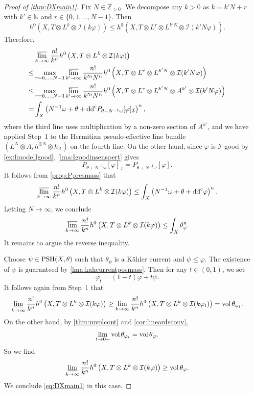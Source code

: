 \begin{proof}[Proof of \cref{thm:DXmain1}]
    Fix $N\in \mathbb{Z}_{>0}$. We decompose any $k>0$ as $k=k'N+r$ with $k'\in \mathbb{N}$ and $r\in \{0,1,\ldots,N-1\}$. Then
    \[
    h^0\left(X,T\otimes L^k\otimes  \mathcal{I}(k\varphi)\right)\leq h^0\left(X,T\otimes L^r \otimes L^{k'N}\otimes  \mathcal{I}(k'N\varphi)\right).
    \]
    Therefore,
    \[
    \begin{aligned}
     &\varlimsup_{k\to\infty}\frac{n!}{k^n}h^0\left(X,T\otimes L^k\otimes  \mathcal{I}(k\varphi)\right)\\
     \leq & \max_{r=0,\ldots,N-1}\varlimsup_{k'\to\infty}\frac{n!}{k'^nN^n} h^0\left(X,T\otimes L^r \otimes L^{k'N}\otimes  \mathcal{I}(k'N\varphi)\right)\\
     \leq & \max_{r=0,\ldots,N-1}\varlimsup_{k'\to\infty}\frac{n!}{k'^nN^n} h^0\left(X,T\otimes L^r \otimes L^{k'N}\otimes A^{k'}\otimes  \mathcal{I}(k'N\varphi)\right)\\
     =& \int_X \left(N^{-1}\omega+\theta+\mathrm{dd}^{\mathrm{c}} P_{\theta+N^{-1}\omega}[\varphi]_{\mathcal{I}}\right)^{n},
    \end{aligned}
    \]
    where the third line uses multiplication by a non-zero section of $A^{k'}$, and we have applied Step~1 to the Hermitian pseudo-effective line bundle $(L^N\otimes A,h^{\otimes N}\otimes h_A)$ on the fourth line.
    On the other hand, since $\varphi$ is $\mathcal{I}$-good by \cref{ex:ImodelIgood}, \cref{lma:Igoodinsenspert} gives
    \[
        P_{\theta+N^{-1}\omega}[\varphi]_{\mathcal{I}}=P_{\theta+N^{-1}\omega}[\varphi].
    \]
    It follows from \cref{prop:Ppresmass} that
    \[
        \varlimsup_{k\to\infty}\frac{n!}{k^n}h^0\left(X,T\otimes L^k\otimes  \mathcal{I}(k\varphi)\right)\leq \int_X   \left(N^{-1}\omega+\theta+\mathrm{dd}^{\mathrm{c}} \varphi\right)^n.
    \]
    Letting $N\to\infty$, we conclude
    \[
        \varlimsup_{k\to\infty}\frac{n!}{k^n}h^0\left(X,T\otimes L^k\otimes  \mathcal{I}(k\varphi)\right)\leq \int_X \theta_{\varphi}^n.
    \]
    It remains to argue the reverse inequality.

    Choose $\psi\in \mathrm{PSH}(X,\theta)$ such that $\theta_{\psi}$ is a Kähler current and $\psi\leq \varphi$. The existence of $\psi$ is guaranteed by \cref{lma:kahcurrentposmass}. Then for any $t\in (0,1)$, we set
    \[
        \varphi_t=(1-t)\varphi+t\psi.
    \]
    It follows again from Step~1 that
    \[
        \varliminf_{k\to\infty}\frac{n!}{k^n}h^0\left(X,T\otimes L^k\otimes  \mathcal{I}(k\varphi)\right)\geq \lim_{k\to\infty}\frac{n!}{k^n}h^0\left(X,T\otimes L^k\otimes  \mathcal{I}(k\varphi_t)\right)=\operatorname{vol} \theta_{\varphi_t}.
    \]
    On the other hand, by \cref{thm:mvolcont} and \cref{cor:lineardsconv},
    \[
        \lim_{t\to 0+}\operatorname{vol} \theta_{\varphi_t}=\operatorname{vol} \theta_{\varphi}.
    \]
    So we find
    \[
        \varliminf_{k\to\infty}\frac{n!}{k^n}h^0\left(X,T\otimes L^k\otimes  \mathcal{I}(k\varphi)\right)\geq \operatorname{vol} \theta_{\varphi}.
    \]
    We conclude \eqref{eq:DXmain1} in this case.


\end{proof}

